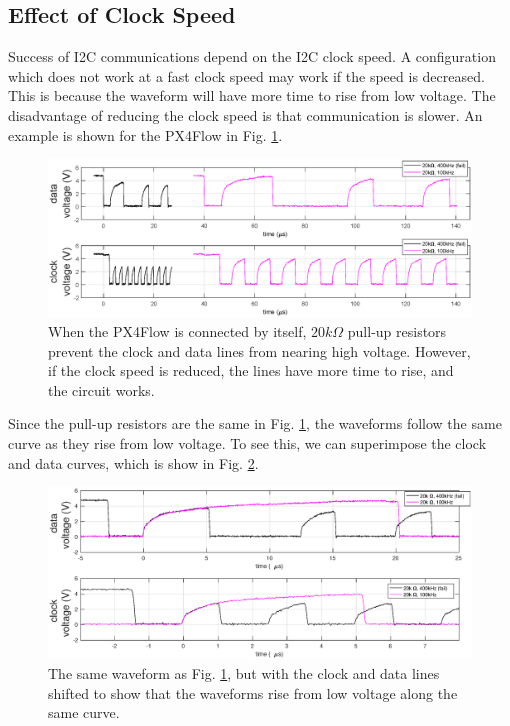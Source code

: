 \documentclass[10pt]{article}
\begin{document}
\subsection*{Effect of Clock Speed}

Success of I2C communications depend on the I2C clock speed. A configuration which does not work at a fast clock speed may work if the speed is decreased. This is because the waveform will have more time to rise from low voltage. The disadvantage of reducing the clock speed is that communication is slower. An example is shown for the PX4Flow in Fig. \ref{fig:clockSpeedShift}.
\begin{figure}[ht]
\centering
\includegraphics[width=1.0\textwidth]{../5microsec/clock_shift_cropped.eps}
\caption{When the PX4Flow is connected by itself, $20 k \Omega$ pull-up resistors prevent the clock and data lines from nearing high voltage. However, if the clock speed is reduced, the lines have more time to rise, and the circuit works.}
\label{fig:clockSpeedShift}
\end{figure}
Since the pull-up resistors are the same in Fig. \ref{fig:clockSpeedShift}, the waveforms follow the same curve as they rise from low voltage. To see this, we can superimpose the clock and data curves, which is show in Fig. \ref{fig:clockSpeedCompare}.
\begin{figure}[ht]
\centering
\includegraphics[width=1.0\textwidth]{../5microsec/clock_compare_zoom_cropped.eps}
\caption{The same waveform as Fig. \ref{fig:clockSpeedShift}, but with the clock and data lines shifted to show that the waveforms rise from low voltage along the same curve.}
\label{fig:clockSpeedCompare}
\end{figure}
\end{document}

